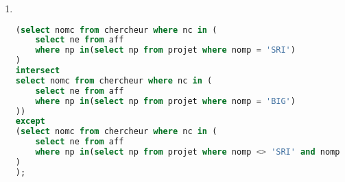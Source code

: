 \begin{enumerate}
{	L'utilisation des opérateurs ensembliste est indispensable, chercher ensuite une requete non ensembliste}
	\begin{lstlisting}[language=SQL, numbers=none]
select nomc from chercheur where nc in (
	select ne from aff 
	where np in(select np from projet where nomp = 'SRI')
)
intersect
select nomc from chercheur where nc in (
	select ne from aff 
	where np in(select np from projet where nomp = 'BIG')
)
	\end{lstlisting}
\item ~ 
	\begin{lstlisting}[language=SQL, numbers=none]
(select nomc from chercheur where nc in (
	select ne from aff 
	where np in(select np from projet where nomp = 'SRI')
)
intersect
select nomc from chercheur where nc in (
	select ne from aff 
	where np in(select np from projet where nomp = 'BIG')
))
except
(select nomc from chercheur where nc in (
	select ne from aff 
	where np in(select np from projet where nomp <> 'SRI' and nomp <> 'BIG')
)
);
	\end{lstlisting}
\end{enumerate}

